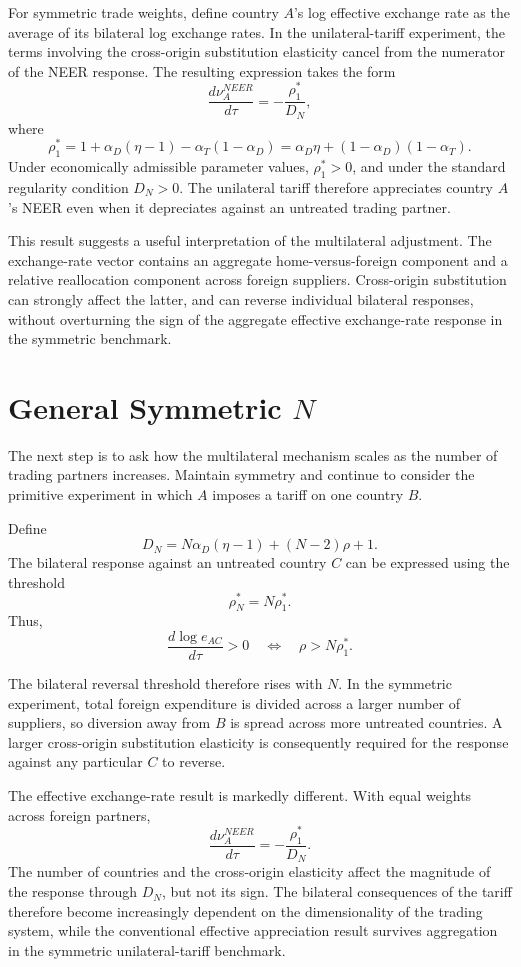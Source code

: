 \documentclass[11pt]{article}
\begin{document}
For symmetric trade weights, define country $A$'s log effective exchange rate as the average of its bilateral log exchange rates. In the unilateral-tariff experiment, the terms involving the cross-origin substitution elasticity cancel from the numerator of the NEER response. The resulting expression takes the form
\[
\frac{d\nu_A^{NEER}}{d\tau}
=
-\frac{\rho_1^*}{D_N},
\]
where
\[
\rho_1^*
=
1+\alpha_D(\eta-1)-\alpha_T(1-\alpha_D)
=
\alpha_D\eta+(1-\alpha_D)(1-\alpha_T).
\]
Under economically admissible parameter values, $\rho_1^*>0$, and under the standard regularity condition $D_N>0$. The unilateral tariff therefore appreciates country $A$'s NEER even when it depreciates against an untreated trading partner.

This result suggests a useful interpretation of the multilateral adjustment. The exchange-rate vector contains an aggregate home-versus-foreign component and a relative reallocation component across foreign suppliers. Cross-origin substitution can strongly affect the latter, and can reverse individual bilateral responses, without overturning the sign of the aggregate effective exchange-rate response in the symmetric benchmark.

\section{General Symmetric $N$}

The next step is to ask how the multilateral mechanism scales as the number of trading partners increases. Maintain symmetry and continue to consider the primitive experiment in which $A$ imposes a tariff on one country $B$.

Define
\[
D_N
=
N\alpha_D(\eta-1)+(N-2)\rho+1.
\]
The bilateral response against an untreated country $C$ can be expressed using the threshold
\[
\rho_N^*=N\rho_1^*.
\]
Thus,
\[
\frac{d\log e_{AC}}{d\tau}>0
\quad\Longleftrightarrow\quad
\rho>N\rho_1^*.
\]

The bilateral reversal threshold therefore rises with $N$. In the symmetric experiment, total foreign expenditure is divided across a larger number of suppliers, so diversion away from $B$ is spread across more untreated countries. A larger cross-origin substitution elasticity is consequently required for the response against any particular $C$ to reverse.

The effective exchange-rate result is markedly different. With equal weights across foreign partners,
\[
\frac{d\nu_A^{NEER}}{d\tau}
=
-\frac{\rho_1^*}{D_N}.
\]
The number of countries and the cross-origin elasticity affect the magnitude of the response through $D_N$, but not its sign. The bilateral consequences of the tariff therefore become increasingly dependent on the dimensionality of the trading system, while the conventional effective appreciation result survives aggregation in the symmetric unilateral-tariff benchmark.
\end{document}
